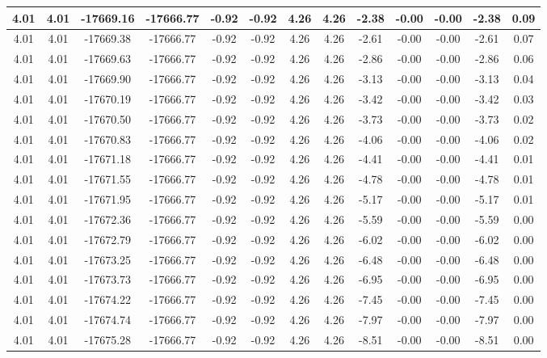\begin{table}[htbp]
\begin{adjustbox}{angle=90}
\begin{tabular}{|c|c|c|c|c|c|c|c|c|c|c|c|c|}
 4.01 & 4.01 & -17669.16 & -17666.77 & -0.92 & -0.92 & 4.26 & 4.26 & -2.38 & -0.00 & -0.00 & -2.38 & 0.09\\ \hline
 4.01 & 4.01 & -17669.38 & -17666.77 & -0.92 & -0.92 & 4.26 & 4.26 & -2.61 & -0.00 & -0.00 & -2.61 & 0.07\\ \hline
 4.01 & 4.01 & -17669.63 & -17666.77 & -0.92 & -0.92 & 4.26 & 4.26 & -2.86 & -0.00 & -0.00 & -2.86 & 0.06\\ \hline
 4.01 & 4.01 & -17669.90 & -17666.77 & -0.92 & -0.92 & 4.26 & 4.26 & -3.13 & -0.00 & -0.00 & -3.13 & 0.04\\ \hline
 4.01 & 4.01 & -17670.19 & -17666.77 & -0.92 & -0.92 & 4.26 & 4.26 & -3.42 & -0.00 & -0.00 & -3.42 & 0.03\\ \hline
 4.01 & 4.01 & -17670.50 & -17666.77 & -0.92 & -0.92 & 4.26 & 4.26 & -3.73 & -0.00 & -0.00 & -3.73 & 0.02\\ \hline
 4.01 & 4.01 & -17670.83 & -17666.77 & -0.92 & -0.92 & 4.26 & 4.26 & -4.06 & -0.00 & -0.00 & -4.06 & 0.02\\ \hline
 4.01 & 4.01 & -17671.18 & -17666.77 & -0.92 & -0.92 & 4.26 & 4.26 & -4.41 & -0.00 & -0.00 & -4.41 & 0.01\\ \hline
 4.01 & 4.01 & -17671.55 & -17666.77 & -0.92 & -0.92 & 4.26 & 4.26 & -4.78 & -0.00 & -0.00 & -4.78 & 0.01\\ \hline
 4.01 & 4.01 & -17671.95 & -17666.77 & -0.92 & -0.92 & 4.26 & 4.26 & -5.17 & -0.00 & -0.00 & -5.17 & 0.01\\ \hline
 4.01 & 4.01 & -17672.36 & -17666.77 & -0.92 & -0.92 & 4.26 & 4.26 & -5.59 & -0.00 & -0.00 & -5.59 & 0.00\\ \hline
 4.01 & 4.01 & -17672.79 & -17666.77 & -0.92 & -0.92 & 4.26 & 4.26 & -6.02 & -0.00 & -0.00 & -6.02 & 0.00\\ \hline
 4.01 & 4.01 & -17673.25 & -17666.77 & -0.92 & -0.92 & 4.26 & 4.26 & -6.48 & -0.00 & -0.00 & -6.48 & 0.00\\ \hline
 4.01 & 4.01 & -17673.73 & -17666.77 & -0.92 & -0.92 & 4.26 & 4.26 & -6.95 & -0.00 & -0.00 & -6.95 & 0.00\\ \hline
 4.01 & 4.01 & -17674.22 & -17666.77 & -0.92 & -0.92 & 4.26 & 4.26 & -7.45 & -0.00 & -0.00 & -7.45 & 0.00\\ \hline
 4.01 & 4.01 & -17674.74 & -17666.77 & -0.92 & -0.92 & 4.26 & 4.26 & -7.97 & -0.00 & -0.00 & -7.97 & 0.00\\ \hline
 4.01 & 4.01 & -17675.28 & -17666.77 & -0.92 & -0.92 & 4.26 & 4.26 & -8.51 & -0.00 & -0.00 & -8.51 & 0.00\\ \hline

\end{tabular}
\end{adjustbox}
\end{table}
